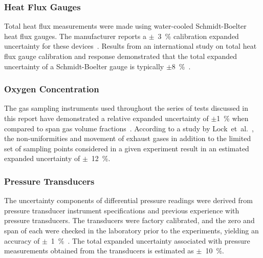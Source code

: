 \documentclass[12pt,oneside]{book}
\begin{document}
\subsubsection*{Heat Flux Gauges}
Total heat flux measurements were made using water-cooled Schmidt-Boelter heat flux gauges. The manufacturer reports a $\pm$~3~\% calibration expanded uncertainty for these devices~\cite{Medtherm:2003}. Results from an international study on total heat flux gauge calibration and response demonstrated that the total expanded uncertainty of a Schmidt-Boelter gauge is typically $\pm$8~\%~\cite{Pitts:2006}.

\subsubsection*{Oxygen Concentration}
The gas sampling instruments used throughout the series of tests discussed in this report have demonstrated a relative expanded uncertainty of $\pm$1~\% when compared to span gas volume fractions~\cite{Bundy:2007}. According to a study by Lock~et~al.~\cite{Lock:1}, the non-uniformities and movement of exhaust gases in addition to the limited set of sampling points considered in a given experiment result in an estimated expanded uncertainty of $\pm$~12~\%.


\subsubsection*{Pressure Transducers}
The uncertainty components of differential pressure readings were derived from pressure transducer instrument specifications and previous experience with pressure transducers. The transducers were factory calibrated, and the zero and span of each were checked in the laboratory prior to the experiments, yielding an accuracy of $\pm$~1~\%~\cite{Setra:2002}. The total expanded uncertainty associated with pressure measurements obtained from the transducers is estimated as $\pm$~10~\%.
\end{document}
